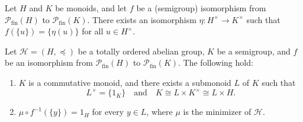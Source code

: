 \documentclass[10pt,a4paper]{amsart}
\newcommand{\fin}{\mathrm{fin}}
\begin{document}
\begin{lemma}
\label{lem:unit-reconstruction}
Let $H$ and $K$ be monoids, and let $f$ be a (semigroup) isomorphism from $\mathcal P_\fin(H)$ to $\mathcal P_\fin(K)$. There exists an isomorphism $\eta: H^\times \to K^\times$ such that $f(\{u\}) = \{\eta(u)\}$ for all $u \in H^\times$.
\end{lemma}

\begin{proposition}
\label{prop:structural-splitting}
Let $\mathcal H = (H, \preceq)$ be a totally ordered abelian group, $K$ be a semigroup, and $f$ be an isomorphism from $\mathcal P_\fin(H)$ to $\mathcal P_\fin(K)$. The following hold: 
\begin{enumerate}[label=\textup{(\roman{*})}]
\item\label{prop:structural-splitting(i)}
$K$ is a commutative monoid, and there exists a submonoid $L$ of $K$ such that 
\begin{equation}
\label{prop:structural-splitting:eq(0)}
L^\times = \{1_K\}
\quad\text{and}\quad
K \cong L \times K^\times \cong L \times H.
\end{equation}
\item\label{prop:structural-splitting(ii)} $\mu \circ f^{-1}(\{y\}) = 1_H$ for every $y \in L$, where $\mu$ is the minimizer of $\mathcal H$.
\end{enumerate}
\end{proposition}
\end{document}
